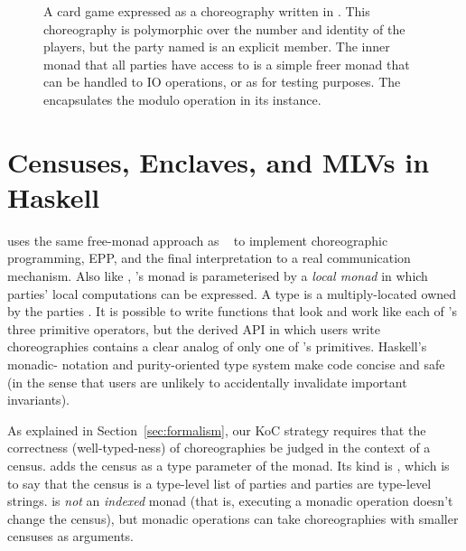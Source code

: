 \begin{figure*}[tbhp]
    \begin{mdframed}
    \inputminted[xleftmargin=10pt,linenos,fontsize=\scriptsize]{haskell}{figures/census-poly-example.hs.txt}
    \caption{A card game expressed as a choreography written in \MultiChor.
             This choreography is polymorphic over the number and identity of the players,
             but the party named  is an explicit member.
             The inner monad  that all parties have access to is a simple freer monad
             that can be handled to IO operations, or as  for testing purposes.
             The  encapsulates the modulo operation in its
              instance.}
    \label{fig:card-game}
    \end{mdframed}
\end{figure*}


\section{Censuses, Enclaves, and MLVs in Haskell}
\label{sec:implementation}

\MultiChor uses the same free-monad approach as \HasChor~\cite{shen-haschor} to implement choreographic programming, EPP,
and the final interpretation to a real communication mechanism.
Also like \HasChor, \MultiChor's  monad is parameterised by a \emph{local monad} in which parties' local computations can be expressed.
A \MultiChor type  is a multiply-located  owned by the parties .
It is possible to write \MultiChor functions that look and work like each of \HasChor's three primitive operators,
but the derived API in which users write \MultiChor choreographies contains a clear analog of only one of \HasChor's primitives.
Haskell's monadic- notation and purity-oriented type system make \MultiChor code concise and safe
(in the sense that users are unlikely to accidentally invalidate important invariants).

As explained in Section~\ref{sec:formalism},
our KoC strategy requires that the correctness (well-typed-ness) of choreographies be judged in the context of a census.
\MultiChor adds the census as a type parameter of the  monad.
Its kind is \inlinecode{[Symbol]},
which is to say that the census is a type-level list of parties and parties are type-level strings.
 is \emph{not} an \emph{indexed} monad (that is, executing a monadic operation doesn't change the census),
but monadic operations can take choreographies with smaller censuses as arguments.

